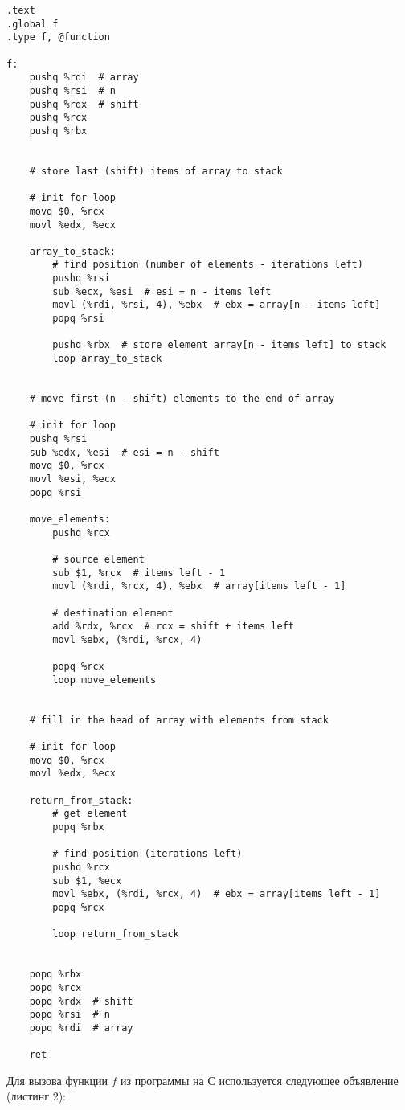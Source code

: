 \begin{lstlisting}[language={[x86masm]Assembler}, caption={Ассемблерная вставка на синтаксисе AT\&T}]
.text
.global f
.type f, @function

f:
    pushq %rdi  # array
    pushq %rsi  # n
    pushq %rdx  # shift
    pushq %rcx
    pushq %rbx


    # store last (shift) items of array to stack

    # init for loop
    movq $0, %rcx
    movl %edx, %ecx
    
    array_to_stack:
        # find position (number of elements - iterations left)
        pushq %rsi
        sub %ecx, %esi  # esi = n - items left
        movl (%rdi, %rsi, 4), %ebx  # ebx = array[n - items left]
        popq %rsi

        pushq %rbx  # store element array[n - items left] to stack
        loop array_to_stack


    # move first (n - shift) elements to the end of array

    # init for loop
    pushq %rsi
    sub %edx, %esi  # esi = n - shift
    movq $0, %rcx
    movl %esi, %ecx
    popq %rsi

    move_elements:
        pushq %rcx

        # source element
        sub $1, %rcx  # items left - 1
        movl (%rdi, %rcx, 4), %ebx  # array[items left - 1]

        # destination element
        add %rdx, %rcx  # rcx = shift + items left
        movl %ebx, (%rdi, %rcx, 4)

        popq %rcx
        loop move_elements


    # fill in the head of array with elements from stack

    # init for loop
    movq $0, %rcx
    movl %edx, %ecx

    return_from_stack:
        # get element
        popq %rbx

        # find position (iterations left)
        pushq %rcx
        sub $1, %ecx
        movl %ebx, (%rdi, %rcx, 4)  # ebx = array[items left - 1]
        popq %rcx

        loop return_from_stack


    popq %rbx
    popq %rcx
    popq %rdx  # shift
    popq %rsi  # n
    popq %rdi  # array

    ret

\end{lstlisting}

Для вызова функции $f$ из программы на С используется следующее объявление (листинг 2):

